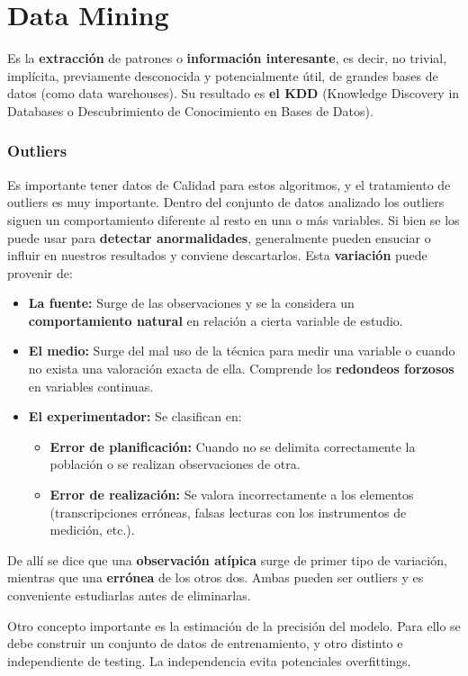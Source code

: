 \section*{Data Mining}

Es la \textbf{extracción} de patrones o \textbf{información interesante}, es decir, no trivial, implícita, previamente desconocida y potencialmente útil, de grandes bases de datos (como data warehouses). Su resultado es \textbf{el KDD} (Knowledge Discovery in Databases o Descubrimiento de Conocimiento en Bases de Datos).

\subsubsection*{Outliers}
Es importante tener datos de Calidad para estos algoritmos, y el tratamiento de outliers es muy importante.
Dentro del conjunto de datos analizado los outliers siguen un comportamiento diferente al resto en una o más variables. Si bien se los puede usar para \textbf{detectar anormalidades}, generalmente pueden ensuciar o influir en nuestros resultados y conviene descartarlos. Esta \textbf{variación} puede provenir de:
\begin{itemize}
    \item \textbf{La fuente:} Surge de las observaciones y se la considera un \textbf{comportamiento natural} en relación a cierta variable de estudio.
    \item \textbf{El medio:} Surge del mal uso de la técnica para medir una variable o cuando no exista una valoración exacta de ella. Comprende los \textbf{redondeos forzosos} en variables continuas.
    \item \textbf{El experimentador:} Se clasifican en:
    \begin{itemize}
        \item \textbf{Error de planificación:} Cuando no se delimita correctamente la población o se realizan observaciones de otra.
        \item \textbf{Error de realización:} Se valora incorrectamente a los elementos (transcripciones erróneas, falsas lecturas con los instrumentos de medición, etc.).
    \end{itemize}
\end{itemize}
De allí se dice que una \textbf{observación atípica} surge de primer tipo de variación, mientras que una \textbf{errónea} de los otros dos. Ambas pueden ser outliers y es conveniente estudiarlas antes de eliminarlas.

Otro concepto importante es la estimación de la precisión del modelo. Para ello se debe construir un conjunto de datos de entrenamiento, y otro distinto e independiente de testing. La independencia evita potenciales overfittings.

